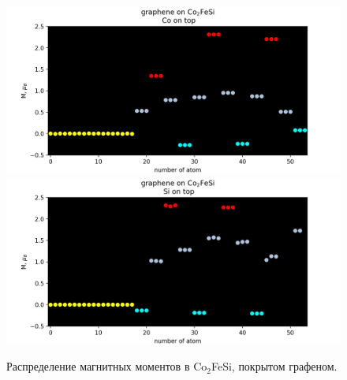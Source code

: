 \documentclass[]{article}
\begin{document}
\begin{figure}[h]
    \centering
    \includegraphics[scale=0.5]{images/co2fesi-graphene-090920_magn_3.png}
    \includegraphics[scale=0.5]{images/co2fesi-graphene-sico-080920_magn_3.png}
    \caption{Распределение магнитных моментов в Co$_2$FeSi, покрытом графеном. }
    \label{fig:magn2}
\end{figure}



 
\end{document}
